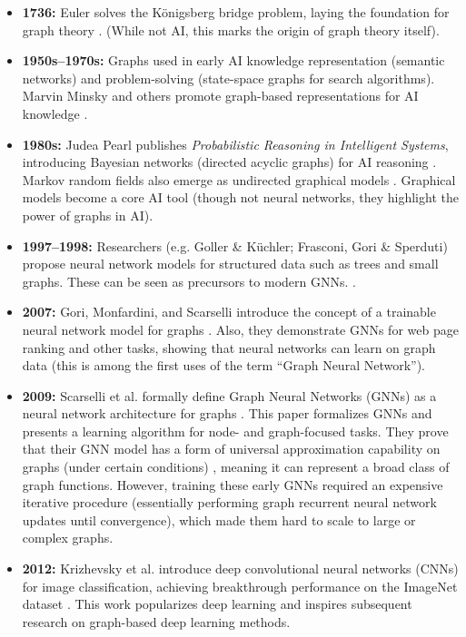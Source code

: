 \documentclass{article}
\begin{document}
\begin{itemize}
      \item \textbf{1736:} Euler solves the Königsberg bridge problem, laying the foundation for graph theory \cite{carlson2019konigsberg}. (While not AI, this marks the origin of graph theory itself).
      \item \textbf{1950s–1970s:} Graphs used in early AI knowledge representation (semantic networks) and problem-solving (state-space graphs for search algorithms). Marvin Minsky and others promote graph-based representations for AI knowledge \cite{kelemen2007neural}.
      \item \textbf{1980s:} Judea Pearl publishes \textit{Probabilistic Reasoning in Intelligent Systems}, introducing Bayesian networks (directed acyclic graphs) for AI reasoning \cite{pearl1995bayesian}. Markov random fields also emerge as undirected graphical models \cite{lang2024abstract}. Graphical models become a core AI tool (though not neural networks, they highlight the power of graphs in AI).
      \item \textbf{1997–1998:} Researchers (e.g. Goller \& Küchler; Frasconi, Gori \& Sperduti) propose neural network models for structured data such as trees and small graphs. These can be seen as precursors to modern GNNs. \cite{frasconi1998general}.
      \item \textbf{2007:} Gori, Monfardini, and Scarselli introduce the concept of a trainable neural network model for graphs \cite{gori2007new}. Also, they demonstrate GNNs for web page ranking and other tasks, showing that neural networks can learn on graph data (this is among the first uses of the term “Graph Neural Network”).
      \item \textbf{2009:} Scarselli et al. formally define Graph Neural Networks (GNNs) as a neural network architecture for graphs \cite{scarselli2009graph}. This paper formalizes GNNs and presents a learning algorithm for node- and graph-focused tasks. They prove that their GNN model has a form of universal approximation capability on graphs (under certain conditions) \cite{scarselli2009computational}, meaning it can represent a broad class of graph functions. However, training these early GNNs required an expensive iterative procedure (essentially performing graph recurrent neural network updates until convergence), which made them hard to scale to large or complex graphs.
      \item \textbf{2012:} Krizhevsky et al. introduce deep convolutional neural networks (CNNs) for image classification, achieving breakthrough performance on the ImageNet dataset \cite{krizhevsky2012imagenet}. This work popularizes deep learning and inspires subsequent research on graph-based deep learning methods.

\end{itemize}
\end{document}
